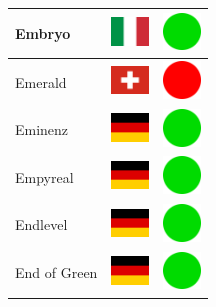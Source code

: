 \documentclass[12pt, a4paper, twoside]{report}
\begin{document}
\begin{center}
\begin{longtable}{|p{5cm}|p{2cm}|p{2cm}|}
 Embryo                                                     & \includegraphics[width=1cm]{../4x3/it} &   \includegraphics[width=1cm]{../likes/y} \\ \hline
 Emerald                                                    & \includegraphics[width=1cm]{../4x3/ch} &   \includegraphics[width=1cm]{../likes/n} \\ \hline
 Eminenz                                                    & \includegraphics[width=1cm]{../4x3/de} &   \includegraphics[width=1cm]{../likes/y} \\ \hline
 Empyreal                                                   & \includegraphics[width=1cm]{../4x3/de} &   \includegraphics[width=1cm]{../likes/y} \\ \hline
 Endlevel                                                   & \includegraphics[width=1cm]{../4x3/de} &   \includegraphics[width=1cm]{../likes/y} \\ \hline
 End of Green                                               & \includegraphics[width=1cm]{../4x3/de} &   \includegraphics[width=1cm]{../likes/y} \\ \hline

\end{longtable}
\end{center}
\end{document}
